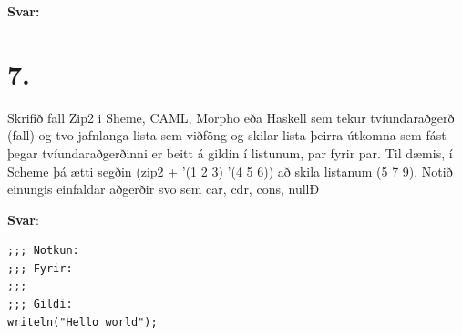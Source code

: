 \documentclass{article}
\begin{document}
     \textbf{Svar:}



     \newpage 

     \section{7.}

     Skrifið fall Zip2 i Sheme, CAML, Morpho eða Haskell sem tekur 
     tvíundaraðgerð (fall) og tvo jafnlanga lista sem viðföng og skilar lista þeirra útkomna sem fást þegar tvíundaraðgerðinni er beitt á
     gildin í listunum, par fyrir par. Til dæmis, í Scheme þá ætti segðin
     (zip2 + '(1 2 3) '(4 5 6)) að skila listanum (5 7 9). Notið einungis
     einfaldar aðgerðir svo sem car, cdr, cons, nullÐ

     \textbf{Svar}:


\begin{lstlisting}
;;; Notkun:
;;; Fyrir:
;;;
;;; Gildi:
writeln("Hello world");  
\end{lstlisting}
\end{document}
